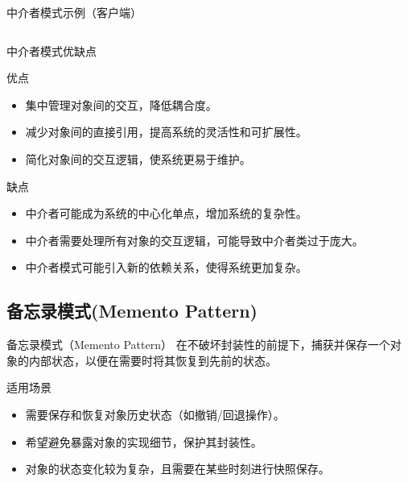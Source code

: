 \documentclass[UTF8,aspectratio=169]{beamer}
\begin{document}
\begin{frame}{中介者模式示例（客户端）}
    \inputminted[firstline=86, lastline=105]{cpp}{code/mediator_pattern.cpp}
\end{frame}

\begin{frame}{中介者模式优缺点}
    \begin{ytublock}{优点}
        \begin{itemize}
            \item 集中管理对象间的交互，降低耦合度。
            \item 减少对象间的直接引用，提高系统的灵活性和可扩展性。
            \item 简化对象间的交互逻辑，使系统更易于维护。
        \end{itemize}
    \end{ytublock}
    \begin{alertytublock}{缺点}
        \begin{itemize}
            \item 中介者可能成为系统的中心化单点，增加系统的复杂性。
            \item 中介者需要处理所有对象的交互逻辑，可能导致中介者类过于庞大。
            \item 中介者模式可能引入新的依赖关系，使得系统更加复杂。
        \end{itemize}
    \end{alertytublock}
\end{frame}

\subsection{备忘录模式(Memento Pattern)}

\begin{frame}{备忘录模式（Memento Pattern）}
    在不破坏封装性的前提下，捕获并保存一个对象的内部状态，以便在需要时将其恢复到先前的状态。

    \begin{ytublock}{适用场景}
        \begin{itemize}
            \item 需要保存和恢复对象历史状态（如撤销/回退操作）。
            \item 希望避免暴露对象的实现细节，保护其封装性。
            \item 对象的状态变化较为复杂，且需要在某些时刻进行快照保存。
        \end{itemize}
    \end{ytublock}
\end{frame}
\end{document}

